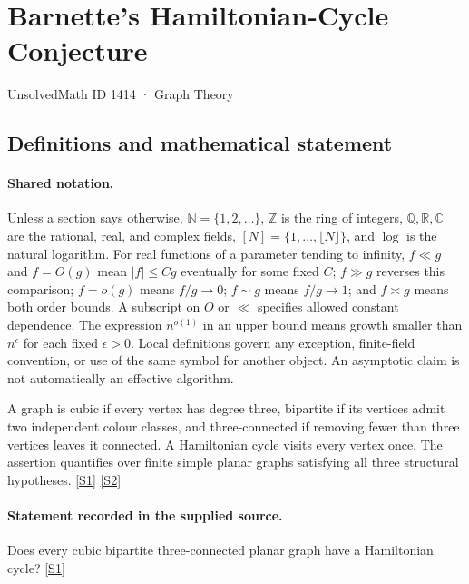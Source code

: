 \documentclass[11pt,a4paper]{article}
\newcommand{\N}{\mathbb{N}}
\newcommand{\Z}{\mathbb{Z}}
\newcommand{\Q}{\mathbb{Q}}
\newcommand{\R}{\mathbb{R}}
\newcommand{\C}{\mathbb{C}}
\newcommand{\sref}[2]{\hyperlink{source:#1:#2}{[S#2]}}
\begin{document}

\setcounter{section}{1413}

\section{Barnette’s Hamiltonian-Cycle Conjecture}\label{1414}

{\small\sffamily UnsolvedMath ID 1414 · Graph Theory}

\subsection{Definitions and mathematical statement}

\paragraph{Shared notation.}Unless a section says otherwise, $\N=\{1,2,\ldots\}$,
$\Z$ is the ring of integers, $\Q,\R,\C$ are the rational, real, and complex
fields, $[N]=\{1,\ldots,\lfloor N\rfloor\}$, and $\log$ is the natural
logarithm. For real functions of a parameter tending to infinity,
$f\ll g$ and $f=O(g)$ mean $|f|\leq Cg$ eventually for some fixed $C$;
$f\gg g$ reverses this comparison; $f=o(g)$ means $f/g\to0$;
$f\sim g$ means $f/g\to1$; and $f\asymp g$ means both order bounds.
A subscript on $O$ or $\ll$ specifies allowed constant dependence.
The expression $n^{o(1)}$ in an upper bound means growth smaller than
$n^\epsilon$ for each fixed $\epsilon>0$. Local definitions govern any
exception, finite-field convention, or use of the same symbol for another
object. An asymptotic claim is not automatically an effective algorithm.



A graph is cubic if every vertex has degree three, bipartite if its vertices admit two independent colour classes, and three-connected if removing fewer than three vertices leaves it connected. A Hamiltonian cycle visits every vertex once. The assertion quantifies over finite simple planar graphs satisfying all three structural hypotheses. \sref{1414}{1} \sref{1414}{2}

\paragraph{Statement recorded in the supplied source.}
Does every cubic bipartite three-connected planar graph have a Hamiltonian cycle? \sref{1414}{1}
\end{document}
